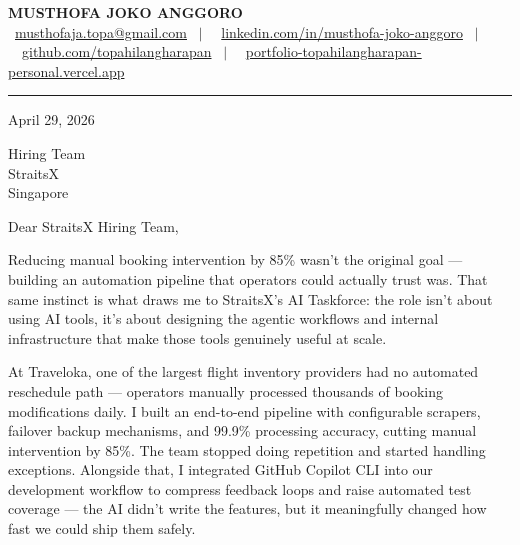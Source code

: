 \documentclass[11pt,a4paper]{article}
\begin{document}
\begin{center}
    {\LARGE \textbf{MUSTHOFA JOKO ANGGORO}} \\[4pt]
    \small
    \faEnvelope\ \href{mailto:musthofaja.topa@gmail.com}{musthofaja.topa@gmail.com}
    \ $|$ \
    \faLinkedin\ \href{https://www.linkedin.com/in/musthofa-joko-anggoro/}{linkedin.com/in/musthofa-joko-anggoro}
    \ $|$ \
    \faGithub\ \href{https://github.com/topahilangharapan}{github.com/topahilangharapan}
    \ $|$ \
    \faGlobe\ \href{https://portfolio-topahilangharapan-personal.vercel.app/}{portfolio-topahilangharapan-personal.vercel.app}
\end{center}

\vspace{4pt}
\hrule
\vspace{14pt}

April 29, 2026

\vspace{6pt}
Hiring Team \\
StraitsX \\
Singapore

\vspace{6pt}
Dear StraitsX Hiring Team,

Reducing manual booking intervention by 85\% wasn't the original goal --- building an
automation pipeline that operators could actually trust was. That same instinct is what
draws me to StraitsX's AI Taskforce: the role isn't about using AI tools, it's about
designing the agentic workflows and internal infrastructure that make those tools
genuinely useful at scale.

At Traveloka, one of the largest flight inventory providers had no automated reschedule
path --- operators manually processed thousands of booking modifications daily. I built
an end-to-end pipeline with configurable scrapers, failover backup mechanisms, and 99.9\%
processing accuracy, cutting manual intervention by 85\%. The team stopped doing
repetition and started handling exceptions. Alongside that, I integrated GitHub Copilot
CLI into our development workflow to compress feedback loops and raise automated test
coverage --- the AI didn't write the features, but it meaningfully changed how fast we
could ship them safely.
\end{document}
